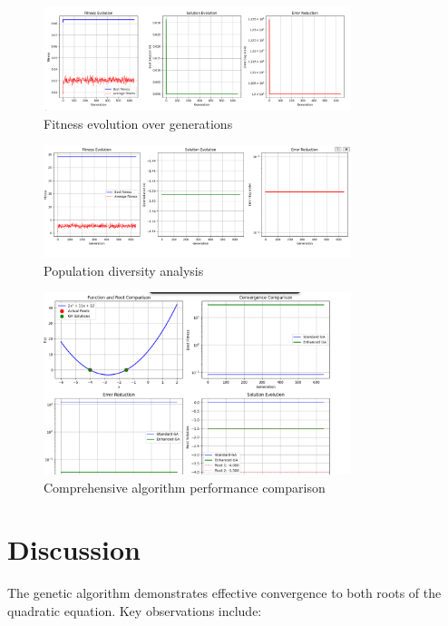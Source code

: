 \documentclass[11pt,a4paper]{article}
\begin{document}
\begin{figure}[H]
\centering
\includegraphics[width=0.8\textwidth]{outputs/plot1.png}
\caption{Fitness evolution over generations}
\end{figure}

\begin{figure}[H]
\centering
\includegraphics[width=0.8\textwidth]{outputs/plots2.png}
\caption{Population diversity analysis}
\end{figure}

\begin{figure}[H]
\centering
\includegraphics[width=0.8\textwidth]{outputs/plot3.png}
\caption{Comprehensive algorithm performance comparison}
\end{figure}

\section{Discussion}

The genetic algorithm demonstrates effective convergence to both roots of the quadratic equation. Key observations include:
\end{document}
